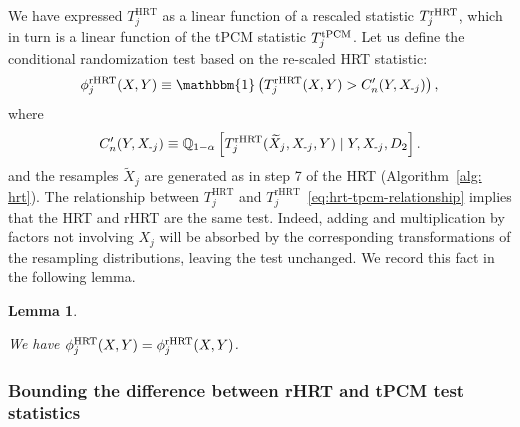 \documentclass[12pt]{article}
\newtheorem{lemma}{Lemma}
\theoremstyle{definition}
\theoremstyle{remark}
\newcommand{\Q}{\mathbb{Q}}								%
\newcommand{\srx}{X}									%
\newcommand{\sry}{Y}									%
\newcommand{\minus}{\textnormal{-}} 						    %
\begin{document}
We have expressed $T_j^{\text{HRT}}$ as a linear function of a rescaled statistic $T^{\textnormal{rHRT}}_j$, which in turn is a linear function of the tPCM statistic $T^{\textnormal{tPCM}}_j$. Let us define the conditional randomization test based on the re-scaled HRT statistic:
\begin{equation}
\phi_j^{\text{rHRT}}(\srx,\sry) \equiv \mathbbm{1}\left(T^{\text{rHRT}}_j(\srx,\sry) > C'_n(\sry,\srx_{\minus j}) \right),
\end{equation}
where
\begin{equation}
C'_n(\sry, \srx_{\minus j}) \equiv \Q_{1-\alpha}\left[T^{\text{rHRT}}_j(\widetilde \srx_j, \srx_{\minus j},\sry) \mid \sry, \srx_{\minus j}, D_2\right].
\end{equation}
and the resamples $\widetilde \srx_j$ are generated as in step 7 of the HRT (Algorithm~\ref{alg: hrt}). The relationship between $T_j^{\text{HRT}}$ and $T_j^{\text{rHRT}}$~\eqref{eq:hrt-tpcm-relationship} implies that the HRT and rHRT are the same test. Indeed, adding and multiplication by factors not involving $\srx_j$ will be absorbed by the corresponding transformations of the resampling distributions, leaving the test unchanged. We record this fact in the following lemma. 

\begin{lemma}\label{lemma:first-reduction-of-HRT}
	
We have $\phi_j^{\textnormal{HRT}}(\srx,\sry) =\phi_j^{\textnormal{rHRT}}(\srx,\sry)$.
	
\end{lemma}

\subsubsection{Bounding the difference between rHRT and tPCM test statistics} \label{sec:asymptotically-negligible-difference}
\end{document}
